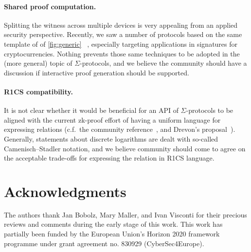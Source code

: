 \documentclass[runningheads]{llncs}
\newif\ifanonymous
\begin{document}
\paragraph{Shared proof computation.} Splitting the witness across multiple devices is very appealing from an applied security perspective.
Recently, we saw a number of protocols based on the same template of of \cref{fig:generic} ~\cite{EPRINT:KomGol20,EPRINT:NicRufSeu20}, especially targeting applications in signatures for cryptocurrencies.
Nothing prevents those same techniques to be adopted in the (more general) topic of $\Sigma$-protocols, and we believe the community should have a discussion if interactive proof generation should be supported.
\paragraph{R1CS compatibility.} It is not clear whether it would be beneficial for an API of $\Sigma$-protocols to be aligned with the current zk-proof effort of having a uniform
language for expressing relations (c.f.\ the community reference~\cite[section 3]{zkproof-reference}, and Drevon's proposal~\cite{jr1cs}).
Generally, statements about discrete logarithms are dealt with so-called Camenisch--Stadler notation, and we believe community should come to agree on the acceptable trade-offs for expressing the relation in R1CS language.

\ifanonymous\else
\section*{Acknowledgments}
The authors thank Jan Bobolz, Mary Maller, and Ivan Visconti for their precious reviews and comments during the early stage of this work.
This work has partially been funded by the European Union's Horizon 2020 framework programme under grant agreement no. 830929 (CyberSec4Europe).
\fi


%
\end{document}

